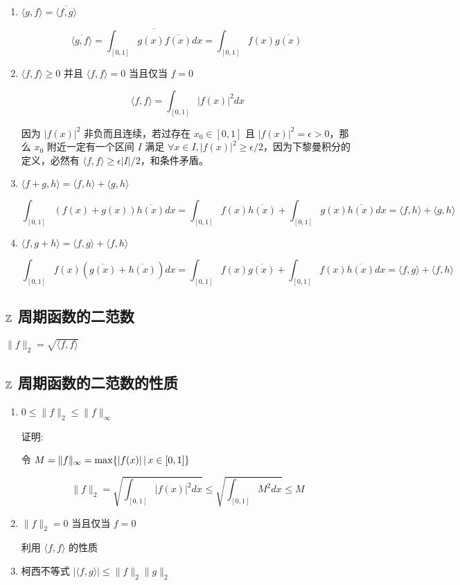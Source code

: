 \begin{enumerate}
    \item $\langle g, f\rangle = \overline{\langle f, g\rangle} $

\[
\overline{\langle g, f\rangle} = \overline{\int_{[0,1]}g(x)\overline{f(x)} dx} = \int_{[0,1]}f(x)\overline{g(x)} \ 
\]

    \item $\langle f, f\rangle \ge 0$ 并且 $\langle f, f\rangle = 0$ 当且仅当 $f = 0$

\[
\langle f, f\rangle = \int_{[0,1]} \lvert f(x)\rvert^2 dx
\]

因为 $\lvert f(x)\rvert^2$  非负而且连续，若过存在 $x_0 \in [0,1]$ 且 $ \lvert f(x)\rvert^2 = \epsilon > 0$，那么 $x_0$ 附近一定有一个区间 $I$ 满足 
$\forall x \in I, \lvert f(x)\rvert^2 \ge \epsilon / 2$，因为下黎曼积分的定义，必然有 $\langle f, f\rangle \ge \epsilon \lvert I \rvert / 2$，和条件矛盾。


    \item $\langle f+g, h\rangle = \langle f, h\rangle +  \langle g, h\rangle$

    \[
    \int_{[0,1]}(f(x) + g(x)) \overline{h(x)} dx = \int_{[0,1]}f(x)\overline{h(x)} +  \int_{[0,1]}g(x)\overline{h(x)}dx = \langle f, h\rangle +  \langle g, h\rangle
    \]

    \item $\langle f, g+h\rangle = \langle f, g\rangle +  \langle f, h\rangle$


    \[
    \int_{[0,1]}f(x) (\overline{g(x)} + \overline{h(x)}) dx = \int_{[0,1]}f(x)\overline{g(x)} +  \int_{[0,1]}f(x)\overline{h(x)}dx = \langle f, g\rangle +  \langle f, h\rangle
    \]
\end{enumerate}

\subsection{$\mathbb{Z}$ 周期函数的二范数}

$\| f \|_2 = \sqrt{\langle f, f\rangle} $

\subsection{$\mathbb{Z}$ 周期函数的二范数的性质}

\begin{enumerate}
    \item $0 \le \| f \|_2 \le \| f \|_\infty$

    证明:

    令 $M = \| f \|_\infty = \max \{ \lvert f(x) \rvert \,\vert\, x \in [0,1] \}$

    \[
\| f \|_2 = \sqrt{\int_{[0,1]}\lvert f(x)\rvert^2 dx} \le \sqrt{\int_{[0,1]}M^2 dx} \le M
    \]

    \item $\| f \|_2 = 0 $ 当且仅当 $f = 0$

    利用 $\langle f, f\rangle $ 的性质

    \item 柯西不等式 $\lvert \langle f, g\rangle \rvert \le \| f \|_2 \| g \|_2$
\end{enumerate}